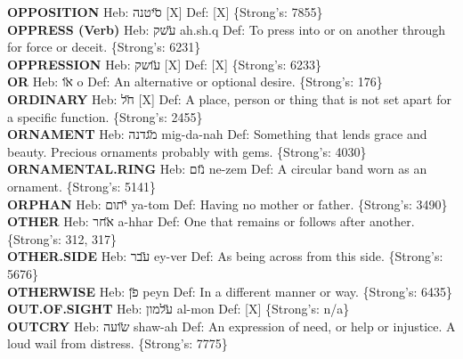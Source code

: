 {\textbf{OPPOSITION} Heb: {\large\H סיטנה} {[}X{]} Def: {[}X{]} \{Strong's: 7855\}\hfill{}\\

\textbf{OPPRESS (Verb)} Heb: {\large\H עשק} ah.sh.q Def: To press into or on another through for force or deceit. \{Strong's: 6231\}\hfill{}\\

\textbf{OPPRESSION} Heb: {\large\H עושק} {[}X{]} Def: {[}X{]} \{Strong's: 6233\}\hfill{}\\

\textbf{OR} Heb: {\large\H או} o Def: An alternative or optional desire. \{Strong's: 176\}\hfill{}\\

\textbf{ORDINARY} Heb: {\large\H חל} {[}X{]} Def: A place, person or thing that is not set apart for a specific function. \{Strong's: 2455\}\hfill{}\\

\textbf{ORNAMENT} Heb: {\large\H מגדנה} mig-da-nah Def: Something that lends grace and beauty. Precious ornaments probably with gems. \{Strong's: 4030\}\hfill{}\\

\textbf{ORNAMENTAL.RING} Heb: {\large\H נזם} ne-zem Def: A circular band worn as an ornament. \{Strong's: 5141\}\hfill{}\\

\textbf{ORPHAN} Heb: {\large\H יתום} ya-tom Def: Having no mother or father. \{Strong's: 3490\}\hfill{}\\

\textbf{OTHER} Heb: {\large\H אחר} a-hhar Def: One that remains or follows after another. \{Strong's: 312, 317\}\hfill{}\\

\textbf{OTHER.SIDE} Heb: {\large\H עבר} ey-ver Def: As being across from this side. \{Strong's: 5676\}\hfill{}\\

\textbf{OTHERWISE} Heb: {\large\H פן} peyn Def: In a different manner or way. \{Strong's: 6435\}\hfill{}\\

\textbf{OUT.OF.SIGHT} Heb: {\large\H עלמון} al-mon Def: {[}X{]} \{Strong's: n/a\}\hfill{}\\

\textbf{OUTCRY} Heb: {\large\H שועה} shaw-ah Def: An expression of need, or help or injustice. A loud wail from distress. \{Strong's: 7775\}\hfill{}\\

}
